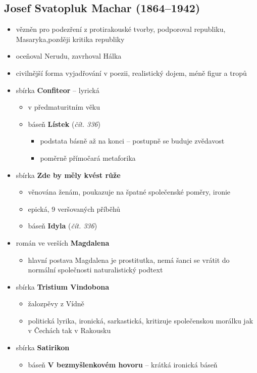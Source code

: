 \subsection{Josef Svatopluk Machar (1864--1942)}
\begin{itemize}
\item vězněn pro podezření z protirakouské tvorby, podporoval republiku, Masaryka,později kritika republiky 
\item oceňoval Nerudu, zavrhoval Hálka
\item civilnější forma vyjadřování v poezii, realistický dojem, méně figur a tropů
\item sbírka \textbf{Confiteor} -- lyrická
	\begin{itemize}
	\item v předmaturitním věku
	\item báseň \textbf{Lístek} (\textit{čít. 336})
		\begin{itemize}
			\item podstata básně až na konci -- postupně se buduje zvědavost
		\item poměrně přímočará metaforika
		\end{itemize}
	\end{itemize}
\item sbírka \textbf{Zde by měly kvést růže}
	\begin{itemize}
	\item věnována ženám, poukazuje na špatné společenské poměry, ironie
	\item epická, 9 veršovaných příběhů
	\item báseň \textbf{Idyla} (\textit{čít. 336})
	\end{itemize}
\item román ve verších \textbf{Magdalena}
	\begin{itemize}
	\item hlavní postava Magdalena je prostitutka, nemá šanci se vrátit do normální společnosti \ra naturalistický podtext
	\end{itemize}
\item sbírka \textbf{Tristium Vindobona}
	\begin{itemize}
	\item žalozpěvy z Vídně
	\item politická lyrika, ironická, sarkastická, kritizuje společenskou morálku jak v Čechách tak v Rakousku
	\end{itemize}
\item sbírka \textbf{Satirikon}
	\begin{itemize}
	\item báseň \textbf{V bezmyšlenkovém hovoru} -- krátká ironická báseň
	\end{itemize}
\end{itemize}

